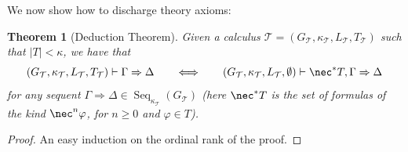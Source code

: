 \documentclass{article}
\newtheorem{thm}{Theorem}
\theoremstyle{definition}
\DeclareMathOperator{\Seq}{Seq}
\begin{document}
We now show how to discharge theory axioms:


\begin{thm}[Deduction Theorem]\label{prop:ded}
Given a calculus 
$\mathcal{T}
= (G_\mathcal{T},\kappa_\mathcal{T}, L_\mathcal{T},T_\mathcal{T})$
such that $|T|<\kappa$, we have that
$$
(G_\mathcal{T},\kappa_\mathcal{T}, L_\mathcal{T},T_\mathcal{T})
\vdash \Gamma \Rightarrow \Delta ~~~~~\iff~~~~~ 
(G_\mathcal{T},\kappa_\mathcal{T}, L_\mathcal{T},\emptyset)%
\vdash 
\nec^* T, \Gamma \Rightarrow \Delta$$
for any sequent $\Gamma \Rightarrow \Delta \in \Seq_{\kappa_{\mathcal{T}}}(G_\mathcal{T})$
(here %
$\nec^* T$ is the set of formulas of the kind $\nec^n \varphi$, for $n\geq0$ and $\varphi \in T$).
\end{thm}
\begin{proof} An easy induction on the ordinal rank of the proof.
\end{proof}
\end{document}
